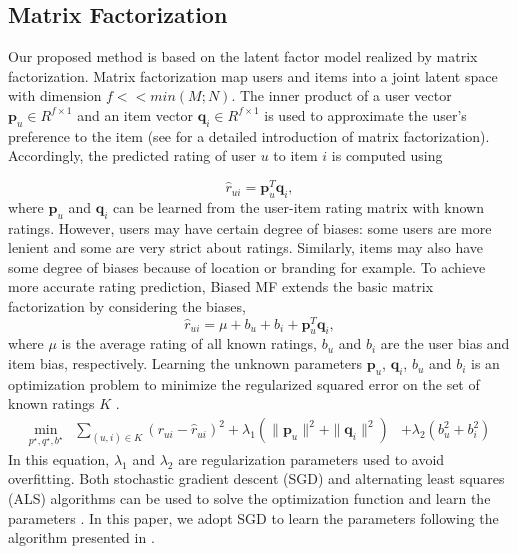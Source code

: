 \documentclass{llncs}
\begin{document}
	\subsection{Matrix Factorization}
    Our proposed method is based on the latent factor model realized
	by matrix factorization. Matrix factorization map users and items into a
    joint latent space with dimension $f << min(M; N)$.
    The inner product of a user vector $\mathbf{p}_u\in R^{f\times1}$
	and an item vector $\mathbf{q}_i\in R^{f\times1}$ is used to approximate the user's
	preference to the item (see \cite{4-1-2} for a detailed introduction of matrix
	factorization). Accordingly, the predicted rating of user $u$ to item $i$
	is computed using

	\begin{equation}\label{1}
		\hat{r}_{ui}=\mathbf{p}_u^T\mathbf{q}_i,
	\end{equation}
	where $\mathbf{p}_u$ and $\mathbf{q}_i$ can be learned from the user-item rating matrix
	with known ratings. However, users may have certain degree of biases:
	some users are more lenient and some are very strict about ratings.
	Similarly, items may also have some degree of biases because of location or branding for example.
	To achieve more accurate rating prediction, Biased MF extends the basic matrix factorization by
	considering the biases,
	\begin{equation}\label{2}
		\hat{r}_{ui}=\mu+b_u+b_i+\mathbf{p}_u^T\mathbf{q}_i,
	\end{equation}
	where $\mu$ is the average rating of all known ratings, $b_u$
	and $b_i$ are the user bias and item bias, respectively.
	Learning the unknown parameters $\mathbf{p}_u$, $\mathbf{q}_i$, $b_u$ and $b_i$ is
	an optimization problem to minimize the regularized squared error on
	the set of known ratings $K$ .
	\begin{eqnarray*}
		\min_{p^\star,q^\star,b^\star} &\sum_{(u,i)\in K} {(r_{ui}-\hat{r}_{ui})^2}+
		\lambda_1(\parallel{\mathbf{p}_u}\parallel^2+\parallel{\mathbf{q}_i}\parallel^2)
		&+\lambda_2(b_u^2+b_i^2)
	\end{eqnarray*}
    In this equation, $\lambda_1$ and $\lambda_2$ are regularization parameters used to avoid overfitting.
	Both stochastic gradient descent (SGD) and alternating least squares (ALS) algorithms
	can be used to solve the optimization function and learn the parameters \cite{4-1-1,4-1-2}.
	In this paper, we adopt SGD to learn the parameters following the algorithm
	presented in \cite{4-1-1}.
	
\end{document}
